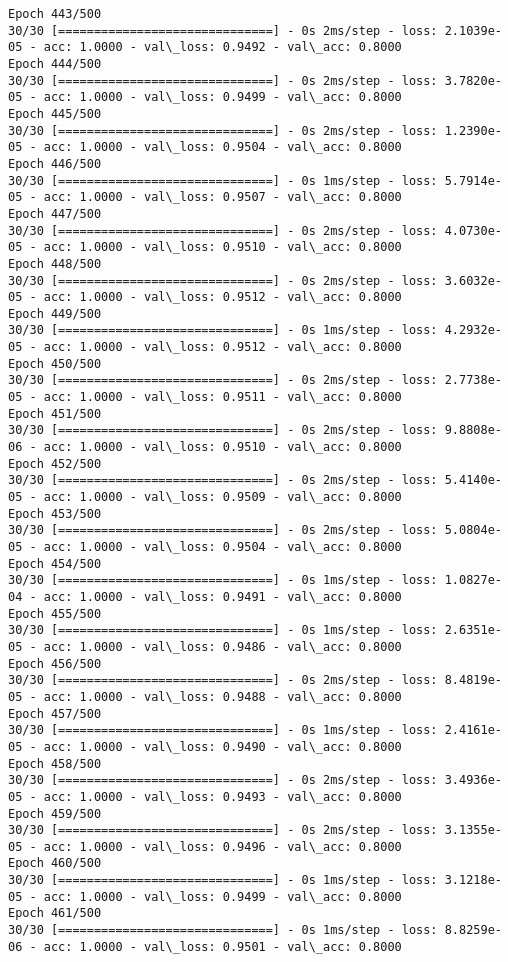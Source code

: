 \documentclass[11pt]{article}
\begin{document}
\begin{Verbatim}[commandchars=\\\{\}]
Epoch 443/500
30/30 [==============================] - 0s 2ms/step - loss: 2.1039e-05 - acc: 1.0000 - val\_loss: 0.9492 - val\_acc: 0.8000
Epoch 444/500
30/30 [==============================] - 0s 2ms/step - loss: 3.7820e-05 - acc: 1.0000 - val\_loss: 0.9499 - val\_acc: 0.8000
Epoch 445/500
30/30 [==============================] - 0s 2ms/step - loss: 1.2390e-05 - acc: 1.0000 - val\_loss: 0.9504 - val\_acc: 0.8000
Epoch 446/500
30/30 [==============================] - 0s 1ms/step - loss: 5.7914e-05 - acc: 1.0000 - val\_loss: 0.9507 - val\_acc: 0.8000
Epoch 447/500
30/30 [==============================] - 0s 2ms/step - loss: 4.0730e-05 - acc: 1.0000 - val\_loss: 0.9510 - val\_acc: 0.8000
Epoch 448/500
30/30 [==============================] - 0s 2ms/step - loss: 3.6032e-05 - acc: 1.0000 - val\_loss: 0.9512 - val\_acc: 0.8000
Epoch 449/500
30/30 [==============================] - 0s 1ms/step - loss: 4.2932e-05 - acc: 1.0000 - val\_loss: 0.9512 - val\_acc: 0.8000
Epoch 450/500
30/30 [==============================] - 0s 2ms/step - loss: 2.7738e-05 - acc: 1.0000 - val\_loss: 0.9511 - val\_acc: 0.8000
Epoch 451/500
30/30 [==============================] - 0s 2ms/step - loss: 9.8808e-06 - acc: 1.0000 - val\_loss: 0.9510 - val\_acc: 0.8000
Epoch 452/500
30/30 [==============================] - 0s 2ms/step - loss: 5.4140e-05 - acc: 1.0000 - val\_loss: 0.9509 - val\_acc: 0.8000
Epoch 453/500
30/30 [==============================] - 0s 2ms/step - loss: 5.0804e-05 - acc: 1.0000 - val\_loss: 0.9504 - val\_acc: 0.8000
Epoch 454/500
30/30 [==============================] - 0s 1ms/step - loss: 1.0827e-04 - acc: 1.0000 - val\_loss: 0.9491 - val\_acc: 0.8000
Epoch 455/500
30/30 [==============================] - 0s 1ms/step - loss: 2.6351e-05 - acc: 1.0000 - val\_loss: 0.9486 - val\_acc: 0.8000
Epoch 456/500
30/30 [==============================] - 0s 2ms/step - loss: 8.4819e-05 - acc: 1.0000 - val\_loss: 0.9488 - val\_acc: 0.8000
Epoch 457/500
30/30 [==============================] - 0s 1ms/step - loss: 2.4161e-05 - acc: 1.0000 - val\_loss: 0.9490 - val\_acc: 0.8000
Epoch 458/500
30/30 [==============================] - 0s 2ms/step - loss: 3.4936e-05 - acc: 1.0000 - val\_loss: 0.9493 - val\_acc: 0.8000
Epoch 459/500
30/30 [==============================] - 0s 2ms/step - loss: 3.1355e-05 - acc: 1.0000 - val\_loss: 0.9496 - val\_acc: 0.8000
Epoch 460/500
30/30 [==============================] - 0s 1ms/step - loss: 3.1218e-05 - acc: 1.0000 - val\_loss: 0.9499 - val\_acc: 0.8000
Epoch 461/500
30/30 [==============================] - 0s 1ms/step - loss: 8.8259e-06 - acc: 1.0000 - val\_loss: 0.9501 - val\_acc: 0.8000

\end{Verbatim}
\end{document}
